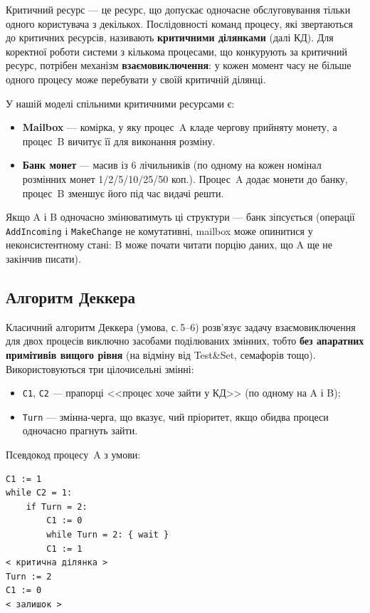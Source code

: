 \documentclass[a4paper,12pt]{article}
\begin{document}
Критичний ресурс --- це ресурс, що допускає одночасне обслуговування
тільки одного користувача з декількох. Послідовності команд процесу,
які звертаються до критичних ресурсів, називають \textbf{критичними
ділянками} (далі КД). Для коректної роботи системи з кількома
процесами, що конкурують за критичний ресурс, потрібен механізм
\textbf{взаємовиключення}: у кожен момент часу не більше одного процесу
може перебувати у своїй критичній ділянці.

У нашій моделі спільними критичними ресурсами є:
\begin{itemize}
    \item \textbf{Mailbox} --- комірка, у яку процес~A кладе чергову
    прийняту монету, а процес~B вичитує її для виконання розміну.
    \item \textbf{Банк монет} --- масив із 6 лічильників (по одному
    на кожен номінал розмінних монет 1/2/5/10/25/50 коп.). Процес~A
    додає монети до банку, процес~B зменшує його під час видачі решти.
\end{itemize}

Якщо A і B одночасно змінюватимуть ці структури --- банк зіпсується
(операції \texttt{AddIncoming} і \texttt{MakeChange} не комутативні,
mailbox може опинитися у неконсистентному стані: B може почати читати
порцію даних, що A ще не закінчив писати).

\subsection{Алгоритм Деккера}

Класичний алгоритм Деккера (умова, с.\,5--6) розв'язує задачу
взаємовиключення для двох процесів виключно засобами поділюваних
змінних, тобто \textbf{без апаратних примітивів вищого рівня}
(на відміну від Test\&Set, семафорів тощо). Використовуються три
цілочисельні змінні:
\begin{itemize}
    \item \texttt{C1}, \texttt{C2} --- прапорці <<процес хоче зайти у
    КД>> (по одному на A і B);
    \item \texttt{Turn} --- змінна-черга, що вказує, чий пріоритет, якщо
    обидва процеси одночасно прагнуть зайти.
\end{itemize}

Псевдокод процесу~A з умови:

\begin{lstlisting}[language=Pseudo,caption={Псевдокод процесу A алгоритму Деккера}]
C1 := 1
while C2 = 1:
    if Turn = 2:
        C1 := 0
        while Turn = 2: { wait }
        C1 := 1
< критична ділянка >
Turn := 2
C1 := 0
< залишок >
\end{lstlisting}
\end{document}
